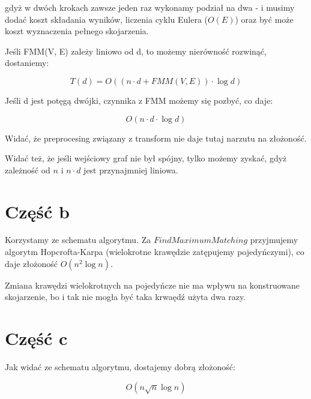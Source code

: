 \documentclass[12pt]{article}
\begin{document}
gdyż w dwóch krokach zawsze jeden raz wykonamy podział na dwa - i musimy dodać koszt składania wyników, liczenia cyklu Eulera ($O(E)$) oraz być może koszt wyznaczenia pełnego skojarzenia.

Jeśli FMM(V, E) zależy liniowo od d, to możemy nierówność rozwinąć, dostaniemy:

\[ T(d) = O((n \cdot d + FMM(V, E)) \cdot \log{d}) \]

Jeśli d jest potęgą dwójki, czynnika z FMM możemy się pozbyć, co daje:

\[ O(n \cdot d \cdot \log{d}) \]

Widać, że preprocesing związany z transform nie daje tutaj narzutu na złożoność.

Widać też, że jeśli wejściowy graf nie był spójny, tylko możemy zyskać, gdyż zależność od $n$ i $n \cdot d$ jest przynajmniej liniowa.

\section{Część b}

Korzystamy ze schematu algorytmu. Za $FindMaximumMatching$ przyjmujemy algorytm Hopcrofta-Karpa (wielokrotne krawędzie zatępujemy pojedyńczymi), co daje złożoność $O(n^{2} \log{n})$.

Zmiana krawędzi wielokrotnych na pojedyńcze nie ma wpływu na konstruowane skojarzenie, bo i  tak nie mogła być taka krwaędź użyta dwa razy.

\section{Część c}

Jak widać ze schematu algorytmu, dostajemy dobrą złożoność:

\[ O(n \sqrt{n} \log{n}) \]
\end{document}
